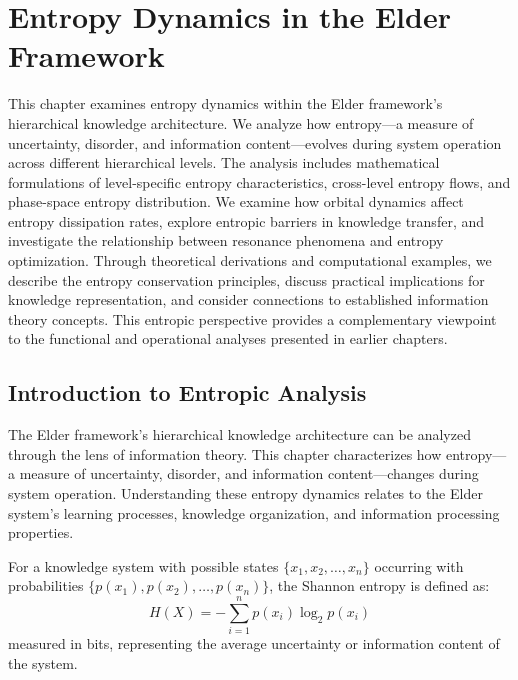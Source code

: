 \chapter{Entropy Dynamics in the Elder Framework}

\begin{tcolorbox}[colback=PureBlue!5!white,colframe=PureBlue!75!black,title=Chapter Summary]
This chapter examines entropy dynamics within the Elder framework's hierarchical knowledge architecture. We analyze how entropy—a measure of uncertainty, disorder, and information content—evolves during system operation across different hierarchical levels. The analysis includes mathematical formulations of level-specific entropy characteristics, cross-level entropy flows, and phase-space entropy distribution. We examine how orbital dynamics affect entropy dissipation rates, explore entropic barriers in knowledge transfer, and investigate the relationship between resonance phenomena and entropy optimization. Through theoretical derivations and computational examples, we describe the entropy conservation principles, discuss practical implications for knowledge representation, and consider connections to established information theory concepts. This entropic perspective provides a complementary viewpoint to the functional and operational analyses presented in earlier chapters.
\end{tcolorbox}

\section{Introduction to Entropic Analysis}

The Elder framework's hierarchical knowledge architecture can be analyzed through the lens of information theory. This chapter characterizes how entropy—a measure of uncertainty, disorder, and information content—changes during system operation. Understanding these entropy dynamics relates to the Elder system's learning processes, knowledge organization, and information processing properties.

\begin{definition}
For a knowledge system with possible states $\{x_1, x_2, \ldots, x_n\}$ occurring with probabilities $\{p(x_1), p(x_2), \ldots, p(x_n)\}$, the Shannon entropy is defined as:
\begin{equation}
H(X) = -\sum_{i=1}^{n} p(x_i) \log_2 p(x_i)
\end{equation}
measured in bits, representing the average uncertainty or information content of the system.
\end{definition}

